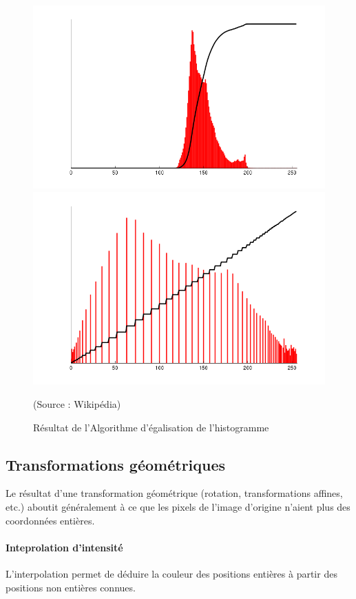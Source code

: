\documentclass[french]{article}
\begin{document}
\begin{figure}[h]
\begin{center}
{\includegraphics[scale=0.16]{images/histo02.png}\includegraphics[scale=0.16]{images/histo04.png}} 
\end{center}
\caption{Résultat de l'Algorithme d'égalisation de l'histogramme}
(Source : Wikipédia)
\end{figure}

\subsection{Transformations géométriques}
Le résultat d'une transformation géométrique (rotation, transformations
affines, etc.) aboutit généralement à ce que les pixels de l'image
d'origine n'aient plus des coordonnées entières.

\paragraph{Inteprolation d'intensité} L'interpolation permet de déduire
la couleur des positions entières à partir des positions non entières
connues.
\end{document}
